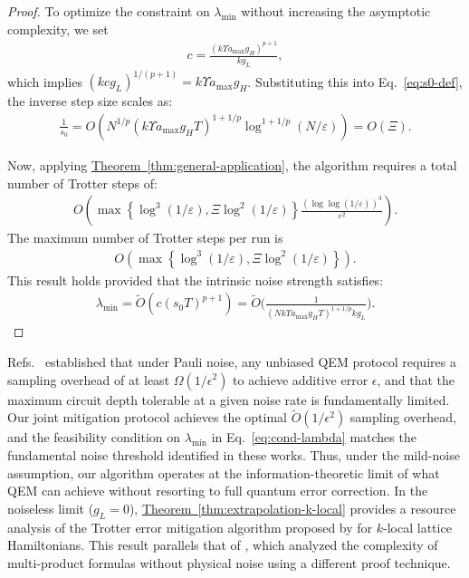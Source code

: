\documentclass[aps,pra,reprint,groupedaddress,floatfix]{revtex4-2}
\newcommand{\thm}[1]{\hyperref[thm:#1]{Theorem~\ref*{thm:#1}}}
\newcommand{\eps}{\varepsilon}
\begin{document}
\begin{proof}
    To optimize the constraint on $\lambda_{\min}$ without increasing the asymptotic complexity, we set
    \begin{align}
    \label{eq:def-c}
        c = \frac{(k\Upsilon a_{\max}g_H)^{p+1}}{kg_L},
    \end{align}
    which implies $(kcg_L)^{1/(p+1)} = k\Upsilon a_{\max}g_H$. Substituting this into Eq.~\eqref{eq:s0-def}, the inverse step size scales as:
    \begin{align*}
        \frac{1}{s_0} = O\left( N^{1/p}(k\Upsilon a_{\max} g_H T)^{1+1/p} \log^{1+1/p}(N/\eps) \right) = O(\Xi).
    \end{align*}

    Now, applying \thm{general-application}, the algorithm requires a total number of Trotter steps of:
    \begin{align*}
         O\left( \max\left\{\log^3(1/\eps), \Xi \log^2(1/\eps)\right\} \frac{(\log\log (1/\eps))^3}{\eps^2} \right).
    \end{align*}
    The maximum number of Trotter steps per run is
    \begin{align*}
  O\left( \max\left\{\log^3(1/\eps), \Xi \log^2(1/\eps)\right\} \right).
    \end{align*}
    This result holds provided that the intrinsic noise strength satisfies:
    \begin{align*}
        \lambda_{\min} = \widetilde{O}(c(s_0T)^{p+1}) = \widetilde{O}\Big(\frac{1}{ (Nk\Upsilon a_{\max}g_HT)^{1+1/p} kg_L }\Big).
    \end{align*}
\end{proof}

Refs.~\cite{wang2021noise, cai2021multi} established that under Pauli noise, any unbiased QEM protocol requires a sampling overhead of at least $\Omega(1/\epsilon^2)$ to achieve additive error $\epsilon$, and that the maximum circuit depth tolerable at a given noise rate is fundamentally limited. Our joint mitigation protocol achieves the optimal $\widetilde{O}(1/\epsilon^2)$ sampling overhead, and the feasibility condition on $\lambda_{\min}$ in Eq.~\eqref{eq:cond-lambda} matches the fundamental noise threshold identified in these works. Thus, under the mild-noise assumption, our algorithm operates at the information-theoretic limit of what QEM can achieve without resorting to full quantum error correction.
In the noiseless limit ($g_L = 0$), \thm{extrapolation-k-local} provides a resource analysis of the Trotter error mitigation algorithm proposed by \citet{watson2025exponentially} for $k$-local lattice Hamiltonians. This result parallels that of \citet{mizuta2025commutator}, which analyzed the complexity of multi-product formulas without physical noise using a different proof technique.
\end{document}
